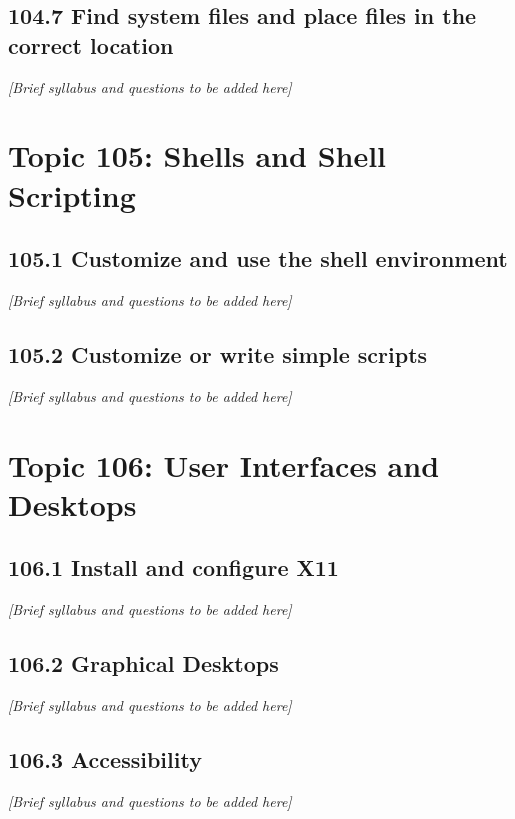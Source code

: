 \documentclass[a4paper]{report}
\begin{document}
\section{104.7 Find system files and place files in the correct location}
\textit{[Brief syllabus and questions to be added here]}

\chapter{Topic 105: Shells and Shell Scripting}
\section{105.1 Customize and use the shell environment}
\textit{[Brief syllabus and questions to be added here]}

\section{105.2 Customize or write simple scripts}
\textit{[Brief syllabus and questions to be added here]}

\chapter{Topic 106: User Interfaces and Desktops}
\section{106.1 Install and configure X11}
\textit{[Brief syllabus and questions to be added here]}

\section{106.2 Graphical Desktops}
\textit{[Brief syllabus and questions to be added here]}

\section{106.3 Accessibility}
\textit{[Brief syllabus and questions to be added here]}

\end{document}
